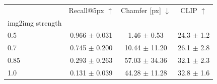 \begin{tabular}{lccc}
\toprule
 & Recall@5px $\uparrow$ & Chamfer [px] $\downarrow$ & CLIP $\uparrow$ \\
img2img strength &  &  &  \\
\midrule
0.5 & 0.966 $\pm$ 0.031 & 1.46 $\pm$ 0.53 & 24.3 $\pm$ 1.2 \\
0.7 & 0.745 $\pm$ 0.200 & 10.44 $\pm$ 11.20 & 26.1 $\pm$ 2.8 \\
0.85 & 0.293 $\pm$ 0.263 & 57.03 $\pm$ 34.36 & 32.1 $\pm$ 2.3 \\
1.0 & 0.131 $\pm$ 0.039 & 44.28 $\pm$ 11.28 & 32.8 $\pm$ 1.6 \\
\bottomrule
\end{tabular}
